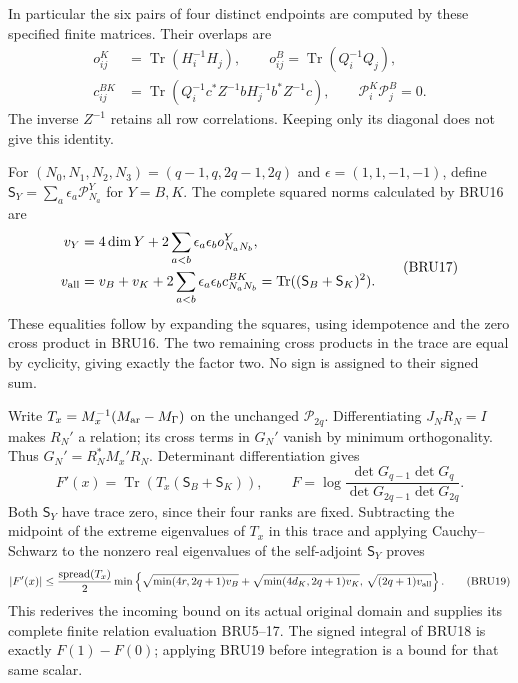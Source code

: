 \documentclass[11pt,a4paper]{article}
\begin{document}
In particular the six pairs of four distinct endpoints are
computed by these specified finite matrices. Their overlaps are
\[
 \begin{aligned}
 o_{ij}^K&=\operatorname{Tr}(H_i^{-1}H_j),\qquad
 o_{ij}^B=\operatorname{Tr}(Q_i^{-1}Q_j),\\
 c_{ij}^{BK}&=\operatorname{Tr}
 (Q_i^{-1}c^*Z^{-1}bH_j^{-1}b^*Z^{-1}c),\qquad
 \mathcal P_i^K\mathcal P_j^B=0.
 \end{aligned}\tag{BRU16}
\]
The inverse $Z^{-1}$ retains all row correlations. Keeping only
its diagonal does not give this identity.

For $(N_0,N_1,N_2,N_3)=(q-1,q,2q-1,2q)$ and
$\epsilon=(1,1,-1,-1)$, define
$\mathsf S_Y=\sum_a\epsilon_a\mathcal P_{N_a}^Y$ for $Y=B,K$.
The complete squared norms calculated by BRU16 are
\[
 \begin{aligned}
 v_Y&=4\dim Y+2\sum_{a<b}\epsilon_a\epsilon_b o^Y_{N_aN_b},\\
 v_{\rm all}&=v_B+v_K+
             2\sum_{a<b}\epsilon_a\epsilon_b c^{BK}_{N_aN_b}
             =\operatorname{Tr}((\mathsf S_B+\mathsf S_K)^2).
 \end{aligned}\tag{BRU17}
\]
These equalities follow by expanding the squares, using idempotence
and the zero cross product in BRU16. The two remaining cross products
in the trace are equal by cyclicity, giving exactly the factor two.
No sign is assigned to their signed sum.

Write $T_x=M_x^{-1}(M_{\rm ar}-M_\Gamma)$ on the unchanged
$\mathcal P_{2q}$. Differentiating $J_NR_N=I$ makes $R_N'$ a
relation; its cross terms in $G_N'$ vanish by minimum orthogonality.
Thus $G_N'=R_N^*M_x'R_N$. Determinant differentiation gives
\[
 F'(x)=\operatorname{Tr}(T_x(\mathsf S_B+\mathsf S_K)),\qquad
 F=\log\frac{\det G_{q-1}\det G_q}{\det G_{2q-1}\det G_{2q}}.
 \tag{BRU18}
\]
Both $\mathsf S_Y$ have trace zero, since their four ranks are fixed.
Subtracting the midpoint of the extreme eigenvalues of $T_x$ in
this trace and applying Cauchy--Schwarz to the nonzero real
eigenvalues of the self-adjoint $\mathsf S_Y$ proves
\[
 |F'(x)|\leq\frac{\operatorname{spread}(T_x)}2
 \min\left\{\sqrt{\min(4r,2q+1)v_B}
            +\sqrt{\min(4d_K,2q+1)v_K},\,
                    \sqrt{(2q+1)v_{\rm all}}\right\}.
 \tag{BRU19}
\]
This rederives the incoming bound on its actual original domain
and supplies its complete finite relation evaluation BRU5--17.
The signed integral of BRU18 is exactly $F(1)-F(0)$; applying
BRU19 before integration is a bound for that same scalar.
\end{document}
